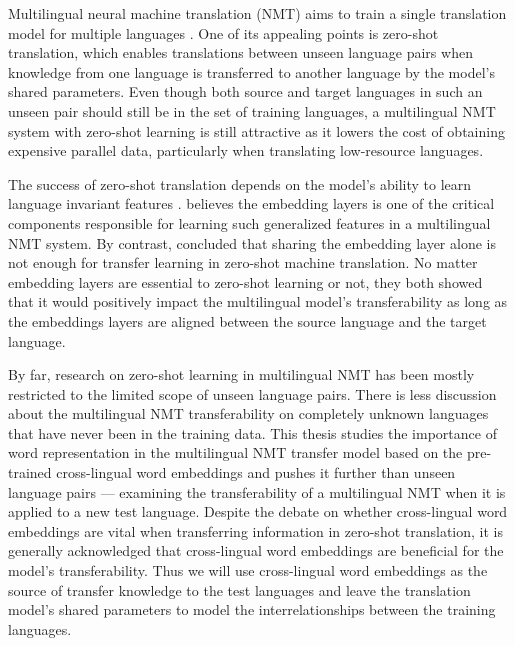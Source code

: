 \documentclass[thesis,fonts=libertine]{cluu}
\begin{document}
Multilingual neural machine translation (NMT) aims to train a single translation model for multiple languages \parencite{Johnson:2016aa,aharoni-etal-2019-massively}. One of its appealing points is zero-shot translation, which enables translations between unseen language pairs when knowledge from one language is transferred to another language by the model's shared parameters. Even though both source and target languages in such an unseen pair should still be in the set of training languages, a multilingual NMT system with zero-shot learning is still attractive as it lowers the cost of obtaining expensive parallel data, particularly when translating low-resource languages.

The success of zero-shot translation depends on the model's ability to learn language invariant features \parencite{Arivazhagan:2019aa}. \textcite{Kim:2019aa} believes the embedding layers is one of the critical components responsible for learning such generalized features in a multilingual NMT system. By contrast, \textcite{aji-etal-2020-neural} concluded that sharing the embedding layer alone is not enough for transfer learning in zero-shot machine translation. No matter embedding layers are essential to zero-shot learning or not, they both showed that it would positively impact the multilingual model's transferability as long as the embeddings layers are aligned between the source language and the target language.

By far, research on zero-shot learning in multilingual NMT has been mostly restricted to the limited scope of unseen language pairs. There is less discussion about the multilingual NMT transferability on completely unknown languages that have never been in the training data. This thesis studies the importance of word representation in the multilingual NMT transfer model based on the pre-trained cross-lingual word embeddings \parencite{Bojanowski:2016aa,Ammar:2016aa,Joulin:2018aa,Ruder:2019aa} and pushes it further than unseen language pairs --- examining the transferability of a multilingual NMT when it is applied to a new test language. Despite the debate on whether cross-lingual word embeddings are vital when transferring information in zero-shot translation, it is generally acknowledged that cross-lingual word embeddings are beneficial for the model's transferability. Thus we will use cross-lingual word embeddings as the source of transfer knowledge to the test languages and leave the translation model's shared parameters to model the interrelationships between the training languages.
\end{document}
